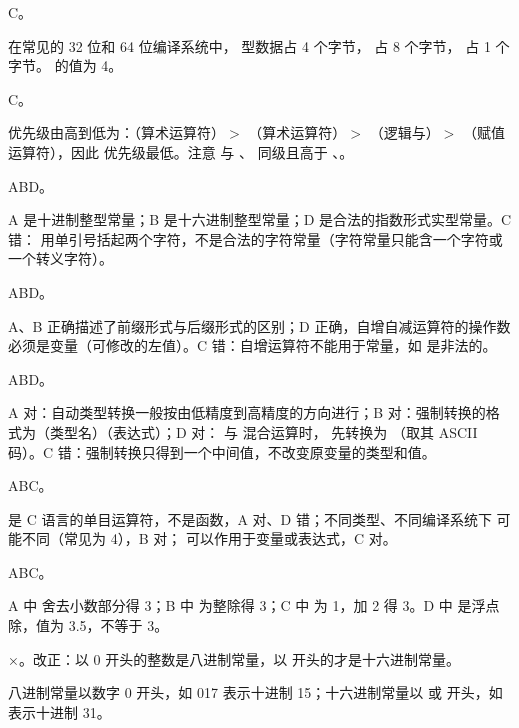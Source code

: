 \documentclass[a4paper,11pt]{article}
\begin{document}
\q C。\begin{analysis}在常见的 32 位和 64 位编译系统中， 型数据占 4 个字节， 占 8 个字节， 占 1 个字节。 的值为 4。\end{analysis}

\q C。\begin{analysis}优先级由高到低为：\code{\%}（算术运算符）$>$ \code{+}（算术运算符）$>$ \code{\&\&}（逻辑与）$>$ \code{=}（赋值运算符），因此 \code{=} 优先级最低。注意 \code{\%} 与 \code{*}、\code{/} 同级且高于 \code{+}、\code{-}。\end{analysis}


\q ABD。\begin{analysis}A 是十进制整型常量；B 是十六进制整型常量；D 是合法的指数形式实型常量。C 错： 用单引号括起两个字符，不是合法的字符常量（字符常量只能含一个字符或一个转义字符）。\end{analysis}

\q ABD。\begin{analysis}A、B 正确描述了前缀形式与后缀形式的区别；D 正确，自增自减运算符的操作数必须是变量（可修改的左值）。C 错：自增运算符不能用于常量，如  是非法的。\end{analysis}

\q ABD。\begin{analysis}A 对：自动类型转换一般按由低精度到高精度的方向进行；B 对：强制转换的格式为（类型名）（表达式）；D 对： 与  混合运算时， 先转换为 （取其 ASCII 码）。C 错：强制转换只得到一个中间值，不改变原变量的类型和值。\end{analysis}

\q ABC。\begin{analysis} 是 C 语言的单目运算符，不是函数，A 对、D 错；不同类型、不同编译系统下  可能不同（常见为 4），B 对； 可以作用于变量或表达式，C 对。\end{analysis}

\q ABC。\begin{analysis}A 中  舍去小数部分得 3；B 中  为整除得 3；C 中  为 1，加 2 得 3。D 中  是浮点除，值为 3.5，不等于 3。\end{analysis}


\q ×。改正：以 0 开头的整数是八进制常量，以  开头的才是十六进制常量。\begin{analysis}八进制常量以数字 0 开头，如 017 表示十进制 15；十六进制常量以  或  开头，如  表示十进制 31。\end{analysis}
\end{document}
